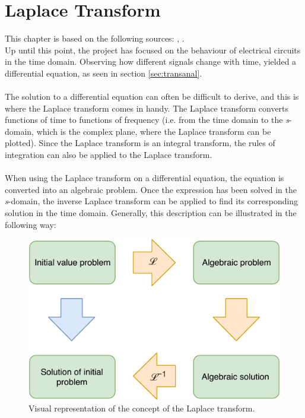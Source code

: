 \chapter{Laplace Transform}
This chapter is based on the following sources: \cite{calc}, \cite{diffandcomplex}. \\
Up until this point, the project has focused on the behaviour of electrical circuits in the time domain. Observing how different signals change with time, yielded a differential equation, as seen in section \ref{sec:transanal}.
\\ \\
The solution to a differential equation can often be difficult to derive, and this is where the Laplace transform comes in handy. The Laplace transform converts functions of time to functions of frequency (i.e. from the time domain to the \textit{s}-domain, which is the complex plane, where the Laplace transform can be plotted). Since the Laplace transform is an integral transform, the rules of integration can also be applied to the Laplace transform.
\\ \\
\noindent When using the Laplace transform on a differential equation, the equation is converted into an algebraic problem. Once the expression has been solved in the \textit{s}-domain, the inverse Laplace transform can be applied to find its corresponding solution in the time domain. Generally, this description can be illustrated in the following way:
\begin{figure}[H]
\center
\includegraphics[scale=1]{fig/img/laplace_circ.pdf}
\caption{Visual representation of the concept of the Laplace transform.}
\label{lpsol}
\end{figure}

